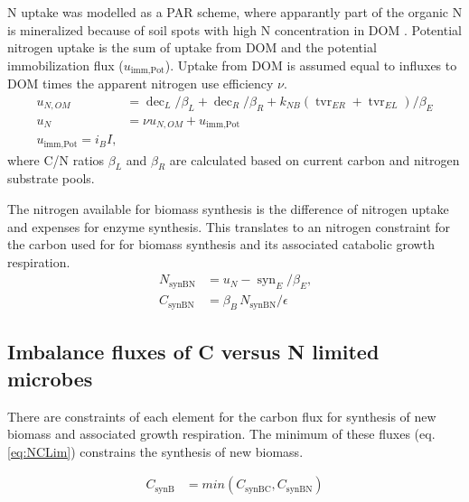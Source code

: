 N uptake was modelled as a PAR scheme, where apparantly part of the organic N is
mineralized because of soil spots with high N concentration in DOM
\citep{Manzoni08}. Potential nitrogen uptake is the sum of uptake from DOM and
the potential immobilization flux ($u_{\operatorname{imm,Pot}}$). Uptake from
DOM is assumed equal to influxes to DOM times the apparent nitrogen use 
efficiency $\nu$.
\begin{subequations}
\label{eq:uN}
\begin{align}
u_{N,OM} &= \operatorname{dec}_L/\beta_L + \operatorname{dec}_R/\beta_R +
k_{NB} (\operatorname{tvr}_{ER} + \operatorname{tvr}_{EL})/\beta_E
\\
u_N &= \nu u_{N,OM} + u_{\operatorname{imm,Pot}}
\\
u_{\operatorname{imm,Pot}} = i_B I 
\text{,}
\end{align}
\end{subequations}
where C/N ratios $\beta_L$ and $\beta_R$ are calculated based on current carbon
and nitrogen substrate pools.  

The nitrogen available for biomass synthesis is the difference of nitrogen
uptake and expenses for enzyme synthesis. This translates to an nitrogen
constraint for the carbon used for for biomass synthesis and its associated
catabolic growth respiration.
\begin{subequations}
\label{eq:synBN}
\begin{align}
N_{\operatorname{synBN}} &= u_N - \operatorname{syn}_E/\beta_E \text{,} \\
C_{\operatorname{synBN}} &= \beta_B \, N_{\operatorname{synBN}}  / \epsilon
\end{align}
\end{subequations}


\subsection{Imbalance fluxes of C versus N limited microbes }
There are constraints of each element for the carbon flux for synthesis of new
biomass and associated growth respiration. The minimum of these fluxes (eq.
\ref{eq:NCLim}) constrains the synthesis of new biomass. 

\begin{subequations}
\begin{align}
\label{eq:NCLim} 
C_{\operatorname{synB}} &=
min(C_{\operatorname{synBC}}, C_{\operatorname{synBN}} )
\end{align}
\end{subequations}

